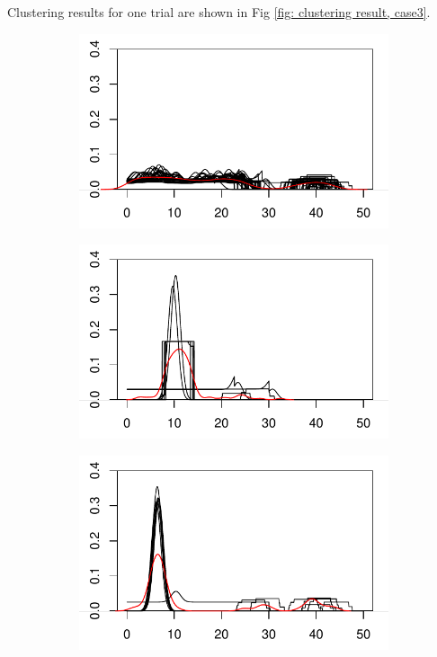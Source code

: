\noindent
Clustering results for one trial are shown in Fig \ref{fig: clustering result, case3}.
\\
\begin{figure}[H]
\begin{minipage}{.49\textwidth}
\begin{subfigure}{\linewidth}
\includegraphics[width=\linewidth]{../simulation/plots/case3_clus1.pdf}
\end{subfigure}
\begin{subfigure}{\linewidth}
\includegraphics[width=\linewidth]{../simulation/plots/case3_clus2.pdf}
\end{subfigure}
\begin{subfigure}{\linewidth}
\includegraphics[width=\linewidth]{../simulation/plots/case3_clus3.pdf}

\end{subfigure}
\end{minipage}
\end{figure}

